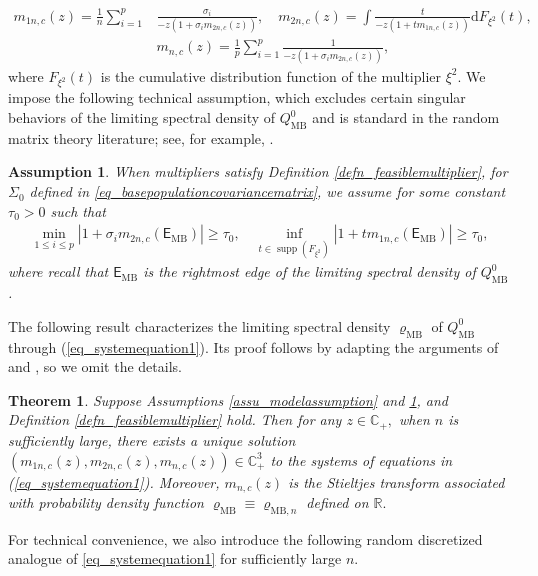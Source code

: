 \documentclass[12pt]{article}
\theoremstyle{plain}
\newtheorem{theorem}{Theorem}[section]
\newtheorem{assumption}{Assumption}[section]
\numberwithin{equation}{section}
\begin{document}
\begin{align}\label{eq_systemequation1}
	m_{1n,c}(z)=\frac{1}{n}\sum_{i=1}^p &\frac{\sigma_i}{-z(1+\sigma_im_{2n,c}(z))},\quad m_{2n,c}(z)=\int\frac{t}{-z(1+ tm_{1n,c}(z))}\mathrm{d}F_{\xi^2}(t) , \nonumber\\
	&m_{n,c}(z)=\frac{1}{p}\sum_{i=1}^p\frac{1}{-z(1+\sigma_im_{2n,c}(z))},
\end{align} 
where $F_{\xi^2}(t)$ is the cumulative distribution function of the multiplier $\xi^2$. We impose the following technical assumption, which excludes certain singular behaviors of the limiting spectral density of $Q_{\mathrm{MB}}^0$ and is standard in the random matrix theory literature; see, for example, \cite{Bao2015,Ding&Yang2018,ding2021spiked,9779233,el2007tracy,Fan2019separable,knowles2017anisotropic,lee2016tracy}.
\begin{assumption}\label{assum_technique}
	When multipliers satisfy Definition \ref{defn_feasiblemultiplier}, for $\Sigma_0$ defined in \eqref{eq_basepopulationcovariancematrix}, we assume for some constant $\tau_0>0$ such that 
	\begin{align*}
		\min_{1\le i\le p}|1+\sigma_i m_{2n,c}(\mathsf{E}_{\mathrm{MB}})|\ge\tau_0,\quad \inf_{t\in\operatorname{supp}(F_{\xi^2})}|1+tm_{1n,c}(\mathsf{E}_{\mathrm{MB}})|\ge\tau_0,
	\end{align*}
	where recall that $\mathsf{E}_{\mathrm{MB}}$ is the rightmost edge of the limiting spectral density of $Q_{\mathrm{MB}}^0$.
\end{assumption}

The following result characterizes the limiting spectral density $\varrho_{\mathrm{MB}}$ of $Q_{\mathrm{MB}}^0$ through (\ref{eq_systemequation1}). Its proof follows by adapting the arguments of \cite[Theorem 2]{Karoui2009} and \cite[Theorem 1]{paul2009no}, so we omit the details.
\begin{theorem}\label{lem_solutionsystem1}
	Suppose Assumptions \ref{assu_modelassumption} and \ref{assum_technique}, and Definition \ref{defn_feasiblemultiplier} hold. Then 
	for any $z \in \mathbb{C}_+,$ when $n$ is sufficiently large, there exists a unique solution $(m_{1n,c}(z), m_{2n,c}(z), m_{n,c}(z)) \in \mathbb{C}_+^3$ to the systems of equations in  (\ref{eq_systemequation1}). Moreover, $m_{n,c}(z)$ is the Stieltjes transform associated with probability density function $\varrho_{\mathrm{MB}}\equiv\varrho_{\mathrm{MB},n}$ defined on $\mathbb{R}.$ 
\end{theorem}
For technical convenience, we also introduce the following random discretized analogue of \eqref{eq_systemequation1} for sufficiently large $n$.
\end{document}
